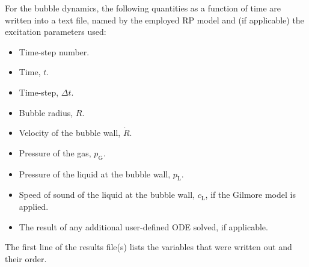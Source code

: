 For the bubble dynamics, the following quantities as a function of time are written into a text file, named by the employed RP model and (if applicable) the excitation parameters used:\vspace{-1em}
\begin{itemize}[noitemsep]
  \item Time-step number.
  \item Time, $t$.
  \item Time-step, $\Delta t$.
  \item Bubble radius, $R$.
  \item Velocity of the bubble wall, $\dot{R}$.
  \item Pressure of the gas, $p_\mathrm{G}$.
  \item Pressure of the liquid at the bubble wall, $p_\mathrm{L}$.
  \item Speed of sound of the liquid at the bubble wall, $c_\mathrm{L}$, if the Gilmore model is applied.
  \item The result of any additional user-defined ODE solved, if applicable.
\end{itemize}

The first line of the results file(s) lists the variables that were written out and their order.
